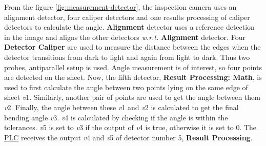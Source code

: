 From the figure \ref{fig:measurement-detector}, the inspection camera uses an alignment detector, four caliper detectors and one results processing of caliper detectors to calculate the angle.
\textbf{Alignment} detector uses a reference detection in the image and aligns the other detectors \textit{w.r.t.} \textbf{Alignment} detector. 
Four \textbf{Detector Caliper} are used to measure the distance between the edges when the detector transitions from dark to light and again from light to dark. Thus two probes, antiparallel setup is used. Angle measurement is of interest, so four points are detected on the sheet. 
Now, the fifth detector, \textbf{Result Processing: Math}, is used to first calculate the angle between two points lying on the same edge of sheet \textit{v}1. Similarly, another pair of points are used to get the angle between them \textit{v}2. Finally, the angle between these \textit{v}1 and \textit{v}2 is calculated to get the final bending angle \textit{v}3. \textit{v}4 is calculated by checking if the angle is within the tolerances. \textit{v}5 is set to \textit{v}3 if the output of \textit{v}4 is true, otherwise it is set to 0. The \hyperref[acro:PLC]{PLC} receives the output \textit{v}4 and \textit{v}5 of detector number 5, \textbf{Result Processing}.
